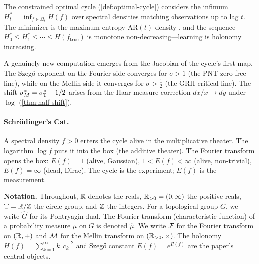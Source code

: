 The constrained optimal cycle (\cref{def:optimal-cycle}) considers the infimum $H_t^* = \inf_{f \in \Omega_t} H(f)$ over spectral densities matching observations up to lag $t$. The minimizer is the maximum-entropy AR$(t)$ density \cite{Burg}, and the sequence $H_0^* \leq H_1^* \leq \cdots \leq H(f_{\mathrm{true}})$ is monotone non-decreasing---learning is holonomy increasing.

A genuinely new computation emerges from the Jacobian of the cycle's first map. The Szeg\H{o} exponent on the Fourier side converges for $\sigma > 1$ (the PNT zero-free line), while on the Mellin side it converges for $\sigma > \tfrac{1}{2}$ (the GRH critical line). The shift $\sigma_M^* = \sigma_{\mathbb{T}}^* - 1/2$ arises from the Haar measure correction $dx/x \to dy$ under $\log$ (\cref{thm:half-shift}).

\paragraph{Schr\"odinger's Cat.}
A spectral density $f > 0$ enters the cycle alive in the multiplicative theater. The logarithm $\log f$ puts it into the box (the additive theater). The Fourier transform opens the box: $E(f) = 1$ (alive, Gaussian), $1 < E(f) < \infty$ (alive, non-trivial), $E(f) = \infty$ (dead, Dirac). The cycle is the experiment; $E(f)$ is the measurement.

\medskip
\noindent\textbf{Notation.}
Throughout, $\mathbb{R}$ denotes the reals, $\mathbb{R}_{>0} = (0, \infty)$ the positive reals, $\mathbb{T} = \mathbb{R} / \mathbb{Z}$ the circle group, and $\mathbb{Z}$ the integers. For a topological group $G$, we write $\widehat{G}$ for its Pontryagin dual. The Fourier transform (characteristic function) of a probability measure $\mu$ on $G$ is denoted $\widehat{\mu}$. We write $\mathcal{F}$ for the Fourier transform on $(\mathbb{R}, +)$ and $\mathcal{M}$ for the Mellin transform on $(\mathbb{R}_{>0}, \times)$. The holonomy $H(f) = \sum_{k=1}^{\infty} k\,|c_k|^2$ and Szeg\H{o} constant $E(f) = e^{H(f)}$ are the paper's central objects.

